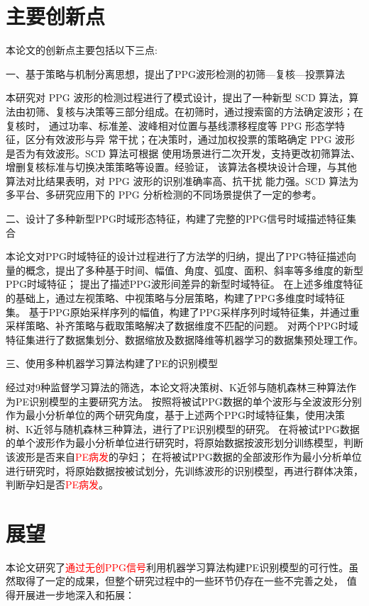 \section{主要创新点}
本论文的创新点主要包括以下三点:

一、基于策略与机制分离思想，提出了PPG波形检测的初筛—复核—投票算法

本研究对 PPG 波形的检测过程进行了模式设计，提出了一种新型 SCD 算法，算
法由初筛、复核与决策等三部分组成。在初筛时，通过搜索窗的方法确定波形；在复核时，
通过功率、标准差、波峰相对位置与基线漂移程度等 PPG 形态学特征，区分有效波形与异
常干扰；在决策时，通过加权投票的策略确定 PPG 波形是否为有效波形。SCD 算法可根据
使用场景进行二次开发，支持更改初筛算法、增删复核标准与切换决策策略等设置。经验证，
该算法各模块设计合理，与其他算法对比结果表明，对 PPG 波形的识别准确率高、抗干扰
能力强。SCD 算法为多平台、多研究应用下的 PPG 分析检测的不同场景提供了一定的参考。

二、设计了多种新型PPG时域形态特征，构建了完整的PPG信号时域描述特征集合

本论文对PPG时域特征的设计过程进行了方法学的归纳，提出了PPG特征描述向量的概念，提出了多种基于时间、幅值、角度、弧度、面积、斜率等多维度的新型PPG时域特征；
提出了描述PPG波形间差异的新型时域特征。
在上述多维度特征的基础上，通过左视策略、中视策略与分层策略，构建了PPG多维度时域特征集。
基于PPG原始采样序列的幅值，构建了PPG采样序列时域特征集，并通过重采样策略、补齐策略与截取策略解决了数据维度不匹配的问题。
对两个PPG时域特征集进行了数据集划分、数据缩放及数据降维等机器学习的数据集预处理工作。


三、使用多种机器学习算法构建了PE的识别模型

经过对9种监督学习算法的筛选，本论文将决策树、K近邻与随机森林三种算法作为PE识别模型的主要研究方法。
按照将被试PPG数据的单个波形与全波波形分别作为最小分析单位的两个研究角度，基于上述两个PPG时域特征集，使用决策树、K近邻与随机森林三种算法，进行了PE识别模型的研究。
在将被试PPG数据的单个波形作为最小分析单位进行研究时，将原始数据按波形划分训练模型，判断该波形是否来自\textcolor{red}{PE病发}的孕妇；
在将被试PPG数据的全部波形作为最小分析单位进行研究时，将原始数据按被试划分，先训练波形的识别模型，再进行群体决策，判断孕妇是否\textcolor{red}{PE病发}。

\section{展望}

本论文研究了\textcolor{red}{通过无创PPG信号}利用机器学习算法构建PE识别模型的可行性。虽然取得了一定的成果，但整个研究过程中的一些环节仍存在一些不完善之处，
值得开展进一步地深入和拓展：

